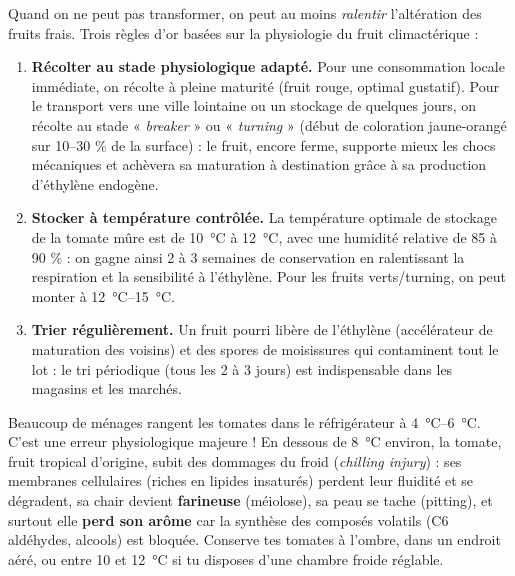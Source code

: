 \documentclass[11pt]{article}
\newcommand{\cle}[1]{{\popxbold\color{popdark}#1}}
\newcounter{popsec}
\newcounter{popsub}
\newcommand{\courssub}[1]{%
  \stepcounter{popsub}%
  \par\vspace{9pt}\noindent{\popxbold\fontsize{11.5}{13}\selectfont\color{popink}{\color{poporange}\thepopsec.\thepopsub}\hspace{6pt}#1}\par\nopagebreak\vspace{4pt}
}
\begin{document}
\courssub{Conservation des tomates fraîches}

Quand on ne peut pas transformer, on peut au moins \emph{ralentir} l'altération des fruits frais. Trois règles d'or basées sur la physiologie du fruit climactérique :

\begin{enumerate}
\item \textbf{Récolter au stade physiologique adapté.} Pour une consommation locale immédiate, on récolte à pleine maturité (fruit rouge, optimal gustatif). Pour le transport vers une ville lointaine ou un stockage de quelques jours, on récolte au stade « \emph{breaker} » ou « \emph{turning} » (début de coloration jaune-orangé sur 10--30 \% de la surface) : le fruit, encore ferme, supporte mieux les chocs mécaniques et achèvera sa maturation à destination grâce à sa production d'éthylène endogène.
\item \textbf{Stocker à température contrôlée.} La température optimale de stockage de la tomate mûre est de \SI{10}{\celsius} à \SI{12}{\celsius}, avec une humidité relative de 85 à 90 \% : on gagne ainsi 2 à 3 semaines de conservation en ralentissant la respiration et la sensibilité à l'éthylène. Pour les fruits verts/turning, on peut monter à \SI{12}{\celsius}--\SI{15}{\celsius}.
\item \textbf{Trier régulièrement.} Un fruit pourri libère de l'éthylène (accélérateur de maturation des voisins) et des spores de moisissures qui contaminent tout le lot : le tri périodique (tous les 2 à 3 jours) est indispensable dans les magasins et les marchés.
\end{enumerate}

\begin{attention}
Beaucoup de ménages rangent les tomates dans le réfrigérateur à \SI{4}{\celsius}--\SI{6}{\celsius}. C'est une erreur physiologique majeure ! En dessous de \SI{8}{\celsius} environ, la tomate, fruit tropical d'origine, subit des \cle{dommages du froid} (\emph{chilling injury}) : ses membranes cellulaires (riches en lipides insaturés) perdent leur fluidité et se dégradent, sa chair devient \textbf{farineuse} (méiolose), sa peau se tache (pitting), et surtout elle \textbf{perd son arôme} car la synthèse des composés volatils (C6 aldéhydes, alcools) est bloquée. Conserve tes tomates à l'ombre, dans un endroit aéré, ou entre 10 et \SI{12}{\celsius} si tu disposes d'une chambre froide réglable.
\end{attention}
\end{document}
